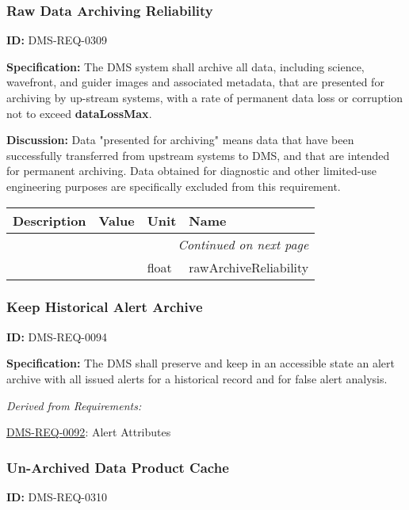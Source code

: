 \documentclass[SE,toc,lsstdraft]{lsstdoc}
\makeatletter
\newcommand{\paramname}[1]{\hspace{0pt}#1}
\newcommand{\unitname}[1]{\hspace{0pt}#1}
\newenvironment{parameters}[0]{%
\setlength\LTleft{0pt}
\setlength\LTright{\fill}
\begin{small}
\begin{longtable}[]{|p{0.5\textwidth}|l|p{0.6in}|p{1.74in}@{}|}

\hline \textbf{Description} & \textbf{Value} & \textbf{Unit} & \textbf{Name} \\ \hline
\endhead

\hline \multicolumn{4}{r}{\emph{Continued on next page}} \\
\endfoot

\hline\hline
\endlastfoot
}{%
\hline
\end{longtable}
\end{small}
}
\makeatother
\begin{document}
\subsubsection{Raw Data Archiving Reliability}

\label{DMS-REQ-0309}
\textbf{ID:} DMS-REQ-0309

\textbf{Specification:} The DMS system shall archive all data, including science, wavefront, and guider images and associated metadata, that are presented for archiving by up-stream systems, with a rate of permanent data loss or corruption not to exceed \textbf{dataLossMax}.

\textbf{Discussion: }Data "presented for archiving" means data that have been successfully transferred from upstream systems to DMS, and that are intended for permanent archiving. Data obtained for diagnostic and other limited-use engineering purposes are specifically excluded from this requirement.



\begin{parameters}

&

&
\unitname{%
float
}
&
\paramname{%
rawArchiveReliability
} \\\hline
\end{parameters}




\subsubsection{Keep Historical Alert Archive}

\label{DMS-REQ-0094}
\textbf{ID:} DMS-REQ-0094

\textbf{Specification: }The DMS shall preserve and keep in an accessible state an alert archive with all issued alerts for a historical record and for false alert analysis.






\emph{Derived from Requirements:}

\hyperref[DMS-REQ-0092]{DMS-REQ-0092}:
Alert Attributes \newline


\subsubsection{Un-Archived Data Product Cache}

\label{DMS-REQ-0310}
\textbf{ID:} DMS-REQ-0310
\end{document}
